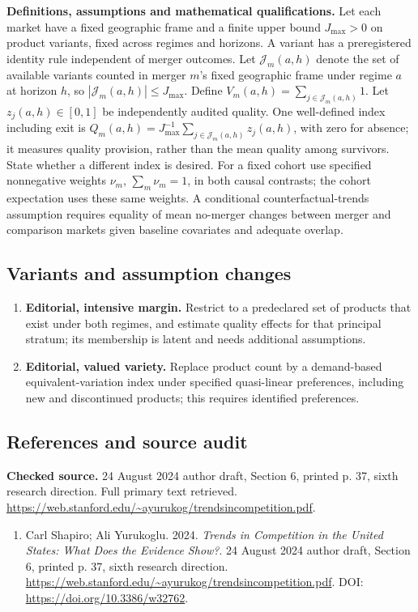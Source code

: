 \documentclass[11pt,a4paper]{article}
\begin{document}
\textbf{Definitions, assumptions and mathematical qualifications.} Let each market have a fixed geographic frame and a finite upper bound \(J_{\max}>0\) on product variants, fixed across regimes and horizons. A variant has a preregistered identity rule independent of merger outcomes. Let \(\mathcal J_m(a,h)\) denote the set of available variants counted in merger \(m\)'s fixed geographic frame under regime \(a\) at horizon \(h\), so \(|\mathcal J_m(a,h)|\leq J_{\max}\). Define \(V_m(a,h)=\sum_{j\in\mathcal J_m(a,h)}1\). Let \(z_j(a,h)\in[0,1]\) be independently audited quality. One well-defined index including exit is \(Q_m(a,h)=J_{\max}^{-1}\sum_{j\in\mathcal J_m(a,h)}z_j(a,h)\), with zero for absence; it measures quality provision, rather than the mean quality among survivors. State whether a different index is desired. For a fixed cohort use specified nonnegative weights \(\nu_m\), \(\sum_m\nu_m=1\), in both causal contrasts; the cohort expectation uses these same weights. A conditional counterfactual-trends assumption requires equality of mean no-merger changes between merger and comparison markets given baseline covariates and adequate overlap.
\subsection*{Variants and assumption changes}
\begin{enumerate}
\item \textbf{Editorial, intensive margin.} Restrict to a predeclared set of products that exist under both regimes, and estimate quality effects for that principal stratum; its membership is latent and needs additional assumptions.
\item \textbf{Editorial, valued variety.} Replace product count by a demand-based equivalent-variation index under specified quasi-linear preferences, including new and discontinued products; this requires identified preferences.
\end{enumerate}
\subsection*{References and source audit}
\textbf{Checked source.} 24 August 2024 author draft, Section 6, printed p. 37, sixth research direction. Full primary text retrieved. \url{https://web.stanford.edu/~ayurukog/trendsincompetition.pdf}.
\begin{enumerate}\raggedright
\item\hypertarget{definitions:source:30007675:1}{} Carl Shapiro; Ali Yurukoglu. 2024. \emph{Trends in Competition in the United States: What Does the Evidence Show?}. 24 August 2024 author draft, Section 6, printed p. 37, sixth research direction.
\url{https://web.stanford.edu/~ayurukog/trendsincompetition.pdf}.
DOI: \url{https://doi.org/10.3386/w32762}.
\end{enumerate}
\end{document}
